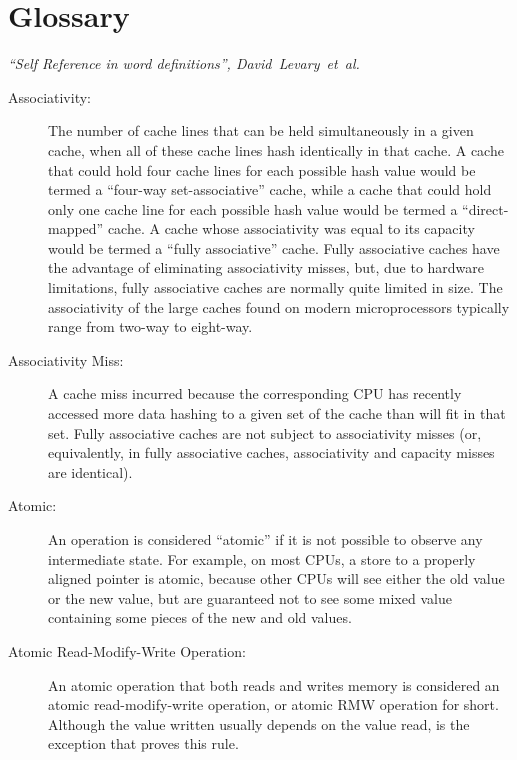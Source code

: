 
\chapter{Glossary}
%
	 {\emph{``Self Reference in word definitions'',
	        David~Levary~et~al.}}

\begin{description}
\item[Associativity:]
	The number of cache lines that can be held simultaneously in
	a given cache, when all of these cache lines hash identically
	in that cache.
	A cache that could hold four cache lines for each possible
	hash value would be termed a ``four-way set-associative'' cache,
	while a cache that could hold only one cache line for each
	possible hash value would be termed a ``direct-mapped'' cache.
	A cache whose associativity was equal to its capacity would
	be termed a ``fully associative'' cache.
	Fully associative caches have the advantage of eliminating
	associativity misses, but, due to hardware limitations,
	fully associative caches are normally quite limited in size.
	The associativity of the large caches found on modern microprocessors
	typically range from two-way to eight-way.
\item[Associativity Miss:]
	A cache miss incurred because the corresponding CPU has recently
	accessed more data hashing to a given set of the cache than will
	fit in that set.
	Fully associative caches are not subject to associativity misses
	(or, equivalently, in fully associative caches, associativity
	and capacity misses are identical).
\item[Atomic:]
	An operation is considered ``atomic'' if it is not possible to
	observe any intermediate state.
	For example, on most CPUs, a store to a properly aligned pointer
	is atomic, because other CPUs will see either the old value or
	the new value, but are guaranteed not to see some mixed value
	containing some pieces of the new and old values.
\item[Atomic Read-Modify-Write Operation:]
	An atomic operation that both reads and writes memory is
	considered an atomic read-modify-write operation, or atomic RMW
	operation for short.
	Although the value written usually depends on the value read,
	 is the exception that proves this rule.

\end{description}
